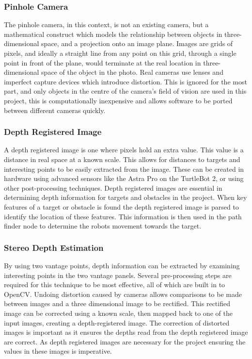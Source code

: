 \documentclass{article}[12]
\begin{document}
		\subsubsection{Pinhole Camera}
		
		The pinhole camera, in this context, is not an existing camera, but a mathematical construct which models the relationship between objects in three-dimensional space, and a projection onto an image plane. Images are grids of pixels, and ideally a straight line from any point on this grid, through a single point in front of the plane, would terminate at the real location in three-dimensional space of the object in the photo. Real cameras use lenses and imperfect capture devices which introduce distortion. This is ignored for the most part, and only objects in the centre of the camera's field of vision are used in this project, this is computationally inexpensive and allows software to be ported between different cameras quickly. 
		
		\subsubsection{Depth Registered Image}

A depth registered image is one where pixels hold an extra value. This value is a distance in real space at a known scale. This allows for distances to targets and interesting points to be easily extracted from the image. These can be created in hardware using advanced sensors like the Astra Pro on the TurtleBot 2, or using other post-processing techniques. Depth registered images are essential in determining depth information for targets and obstacles in the project. When key features of a target or obstacle is found the depth registered image is parsed to identify the location of these features. This information is then used in the path finder node to determine the robots movement towards the target.   
		
		\subsubsection{Stereo Depth Estimation}
		
		By using two vantage points, depth information can be extracted by examining interesting points in the two vantage panels. Several pre-processing steps are required for this technique to be most effective, all of which are built in to OpenCV. Undoing distortion caused by cameras allows comparisons to be made between images and a three dimensional image to be rectified. This rectified image can be corrected using a known scale, then mapped back to one of the input images, creating a depth-registered image. The correction of distorted images is important as it ensures the depths read from the depth registered image are correct. As depth registered images are necessary for the project ensuring the values in these images is imperative.
		
\end{document}
